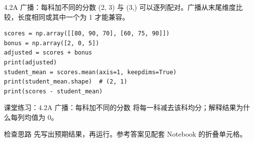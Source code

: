 \begin{frame}[fragile]{4.2A 广播：每科加不同的分数}
\small (2, 3) 与 (3,) 可以逐列配对。广播从末尾维度比较，长度相同或其中一个为 1 才能兼容。
\medskip
\begin{lstlisting}
scores = np.array([[80, 90, 70], [60, 75, 90]])
bonus = np.array([2, 0, 5])
adjusted = scores + bonus
print(adjusted)
student_mean = scores.mean(axis=1, keepdims=True)
print(student_mean.shape)  # (2, 1)
print(scores - student_mean)
\end{lstlisting}
\end{frame}
\begin{frame}[fragile]{课堂练习：4.2A 广播：每科加不同的分数}
将每一科减去该科均分；解释结果为什么每列均值为 0。
\medskip
\begin{block}{检查思路}
先写出预期结果，再运行。参考答案见配套 Notebook 的折叠单元格。
\end{block}
\end{frame}
